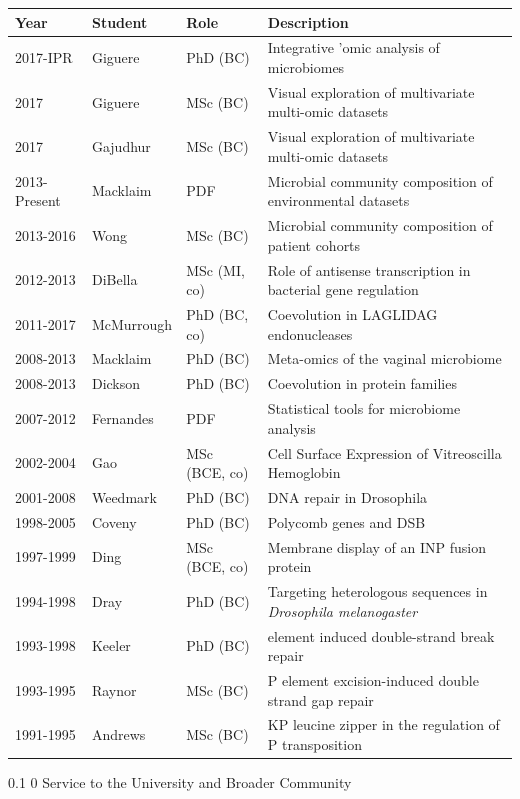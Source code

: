 \documentclass[11pt]{article}
\makeatletter
\renewcommand\section{\@startsection
	{section}{1}{0in}%
	{0.1\baselineskip}%
	{0\baselineskip}%
	{\sffamily\bfseries\large}
}
\makeatother
\begin{document}
\vspace{0.5cm}
\begin{tabular}{llll}
Year & Student & Role &  Description \\ \hline
2017-IPR & Giguere & PhD (BC) & Integrative 'omic analysis  of microbiomes\\
2017 & Giguere & MSc (BC) & Visual exploration of multivariate multi-omic datasets\\
2017 & Gajudhur & MSc (BC) & Visual exploration of multivariate multi-omic datasets\\
2013-Present & Macklaim & PDF & Microbial community composition of environmental datasets\\
2013-2016 & Wong & MSc (BC) & Microbial community composition of patient cohorts\\
2012-2013 & DiBella & MSc (MI, co) & Role of antisense transcription in bacterial gene regulation\\
2011-2017 & McMurrough & PhD (BC, co) & Coevolution in LAGLIDAG endonucleases\\
2008-2013 & Macklaim & PhD (BC) & Meta-omics of the vaginal microbiome\\
2008-2013 & Dickson & PhD (BC) & Coevolution in protein families\\
2007-2012 & Fernandes & PDF & Statistical tools for microbiome analysis\\
2002-2004 & Gao & MSc (BCE, co) & Cell Surface Expression of Vitreoscilla Hemoglobin \\
2001-2008 & Weedmark & PhD (BC) & DNA repair in Drosophila\\
1998-2005 & Coveny & PhD (BC) & Polycomb genes and DSB\\
1997-1999 & Ding & MSc (BCE, co) & Membrane display of an INP fusion protein\\
1994-1998 & Dray & PhD (BC) & Targeting heterologous sequences in \emph{Drosophila melanogaster}\\
1993-1998 & Keeler & PhD (BC) &  element induced double-strand break repair\\
1993-1995 & Raynor & MSc (BC) & P element excision-induced double strand gap repair \\
1991-1995 & Andrews & MSc (BC)&  KP leucine zipper in the regulation of P transposition\\
\end{tabular} 

\clearpage

\section{Service to the University and Broader Community}
\end{document}
